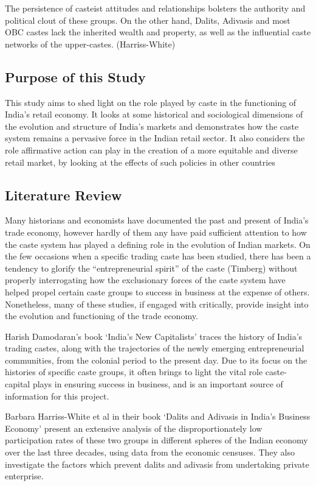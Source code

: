 \documentclass[]{article}
\begin{document}
The persistence of casteist attitudes and relationships bolsters the
authority and political clout of these groups. On the other hand,
Dalits, Adivasis and most OBC castes lack the inherited wealth and
property, as well as the influential caste networks of the upper-castes.
(Harriss-White)

\subsection{Purpose of this Study}\label{purpose-of-this-study}

This study aims to shed light on the role played by caste in the
functioning of India's retail economy. It looks at some historical and
sociological dimensions of the evolution and structure of India's
markets and demonstrates how the caste system remains a pervasive force
in the Indian retail sector. It also considers the role affirmative
action can play in the creation of a more equitable and diverse retail
market, by looking at the effects of such policies in other countries

\subsection{Literature Review}\label{literature-review}

Many historians and economists have documented the past and present of
India's trade economy, however hardly of them any have paid sufficient
attention to how the caste system has played a defining role in the
evolution of Indian markets. On the few occasions when a specific
trading caste has been studied, there has been a tendency to glorify the
``entrepreneurial spirit'' of the caste (Timberg) without properly
interrogating how the exclusionary forces of the caste system have
helped propel certain caste groups to success in business at the expense
of others. Nonetheless, many of these studies, if engaged with
critically, provide insight into the evolution and functioning of the
trade economy.

Harish Damodaran's book `India's New Capitalists' traces the history of
India's trading castes, along with the trajectories of the newly
emerging entrepreneurial communities, from the colonial period to the
present day. Due to its focus on the histories of specific caste groups,
it often brings to light the vital role caste-capital plays in ensuring
success in business, and is an important source of information for this
project.

Barbara Harriss-White et al in their book `Dalits and Adivasis in
India's Business Economy' present an extensive analysis of the
disproportionately low participation rates of these two groups in
different spheres of the Indian economy over the last three decades,
using data from the economic censuses. They also investigate the factors
which prevent dalits and adivasis from undertaking private enterprise.
\end{document}
